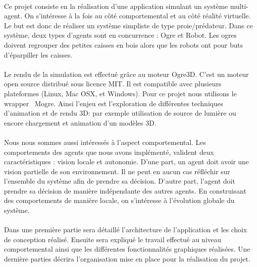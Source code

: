 \paragraph{}Ce projet consiste en la réalisation d'une application simulant un système
multi-agent. On s'intéresse à la fois au côté comportemental et au côté réalité virtuelle.
Le but est donc de réaliser un système simpliste de type proie/prédateur.
Dans ce système, deux types d'agents sont en concurrence : Ogre et Robot. Les
ogres doivent regrouper des petites caisses en bois alors que les robots ont
pour buts d'éparpiller les caisses.

\paragraph{}Le rendu de la simulation est effectué grâce au moteur Ogre3D.
C'est un moteur open source distribué sous licence MIT. Il est compatible
avec plusieurs plateformes (Linux, Mac OSX, et Windows). Pour ce projet nous
utilisons le wrapper \CS~Mogre. Ainsi l'enjeu est l'exploration de différentes
techniques d'animation et de rendu 3D: par exemple utilisation de source de lumière ou 
encore chargement et animation d'un modèles 3D. 

\paragraph{}Nous nous sommes aussi intéressés à l'aspect comportemental. Les comportements 
des agents que nous avons implémenté, valident deux caractéristiques : vision locale et 
autonomie. D'une part, un agent doit avoir une vision partielle de son
environnement. 
Il ne peut en aucun cas réfléchir sur l'ensemble du système afin de prendre sa décision. 
D'autre part, l'agent doit prendre sa décision de manière indépendante des autres agents.
En construisant des comportements de manière locale, on s'intéresse à l'évolution globale
du système.


\paragraph{} Dans une première partie sera détaillé l'architecture de
l'application et les choix de conception réalisé. Ensuite sera expliqué le
travail effectué au niveau comportemental ainsi que les différentes
fonctionnalités graphiques réalisées. Une dernière parties décrira
l'organisation mise en place pour la réalisation du projet.
